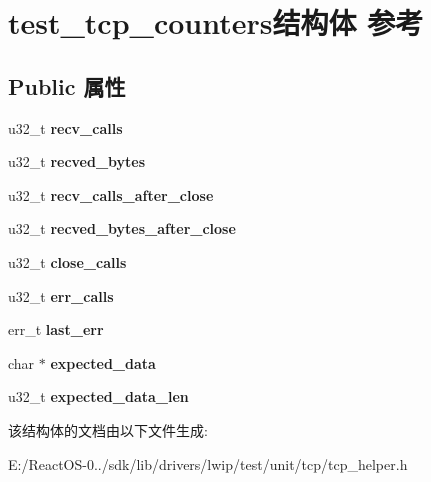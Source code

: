\hypertarget{structtest__tcp__counters}{}\section{test\+\_\+tcp\+\_\+counters结构体 参考}
\label{structtest__tcp__counters}
\subsection*{Public 属性}
\begin{DoxyCompactItemize}
\item 
\mbox{\label{structtest__tcp__counters_af31bbabce2e91642b6e39fee0b0a1ac4}} 
u32\+\_\+t {\bfseries recv\+\_\+calls}
\item 
\mbox{\label{structtest__tcp__counters_a1ac42e63bd4e3ad41bff07d61bfb1741}} 
u32\+\_\+t {\bfseries recved\+\_\+bytes}
\item 
\mbox{\label{structtest__tcp__counters_af23337c680f3c9c867541d8807a042e1}} 
u32\+\_\+t {\bfseries recv\+\_\+calls\+\_\+after\+\_\+close}
\item 
\mbox{\label{structtest__tcp__counters_add2b14593471262f5efab948cb3006c6}} 
u32\+\_\+t {\bfseries recved\+\_\+bytes\+\_\+after\+\_\+close}
\item 
\mbox{\label{structtest__tcp__counters_ae93b852a5dd9062c42e93e757e0004bf}} 
u32\+\_\+t {\bfseries close\+\_\+calls}
\item 
\mbox{\label{structtest__tcp__counters_a580a799125c6487fc79bc75202856a24}} 
u32\+\_\+t {\bfseries err\+\_\+calls}
\item 
\mbox{\label{structtest__tcp__counters_ac63af9f4d7d64d9f38fd165469e16741}} 
err\+\_\+t {\bfseries last\+\_\+err}
\item 
\mbox{\label{structtest__tcp__counters_adc93e01c81dda2c1c27ce029dd7ea518}} 
char $\ast$ {\bfseries expected\+\_\+data}
\item 
\mbox{\label{structtest__tcp__counters_ac179b79c73be64b57abe7ed62c693324}} 
u32\+\_\+t {\bfseries expected\+\_\+data\+\_\+len}
\end{DoxyCompactItemize}


该结构体的文档由以下文件生成\+:\begin{DoxyCompactItemize}
\item 
E\+:/\+React\+O\+S-\/0../sdk/lib/drivers/lwip/test/unit/tcp/tcp\+\_\+helper.\+h\end{DoxyCompactItemize}
